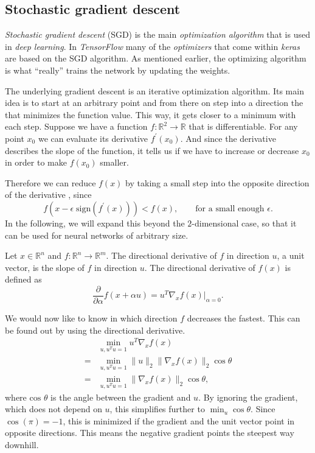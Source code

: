 \subsection{Stochastic gradient descent}
\label{sec:stochastic-gradient-descent}
\emph{Stochastic gradient descent} (SGD) is the main \emph{optimization algorithm} that is used in \emph{deep learning}.
In \emph{TensorFlow} many of the \emph{optimizers} that come within \emph{keras} are based on the SGD algorithm.
As mentioned earlier, the optimizing algorithm is what \enquote{really} trains the network by updating the weights.

The underlying gradient descent is an iterative optimization algorithm.
Its main idea is to start at an arbitrary point and from there on step into a direction the that minimizes the function value.
This way, it gets closer to a minimum with each step.
Suppose we have a function \(f : \mathbb{R}^2 \rightarrow \mathbb{R}\) that is differentiable.
For any point \(x_0\) we can evaluate its derivative \(f^{\prime}(x_0)\).
And since the derivative describes the slope of the function, it tells us if we have to increase or decrease \(x_0\) in order to make \(f(x_0)\) smaller.

Therefore we can reduce \(f(x)\) by taking a small step into the opposite direction of the derivative \cite{cauchy}, since
\begin{equation}
    \label{eq:cauchy}
    f(x - \epsilon \; \text{sign}(f^{\prime}(x))) < f(x), \qquad \text{for a small enough } \epsilon.
\end{equation}
In the following, we will expand this beyond the \(2\)-dimensional case, so that it can be used for neural networks of arbitrary size.

Let \(x \in \mathbb{R}^n\) and \(f : \mathbb{R}^n \rightarrow \mathbb{R}^m\).
The directional derivative of \(f\) in direction \(u\), a unit vector, is the slope of \(f\) in direction \(u\).
The directional derivative of \(f(x)\) is defined as 
\begin{equation}
    \frac{\partial}{\partial \alpha} f(x + \alpha u) = u^{T} \nabla_x f(x) \big\vert_{\alpha = 0}.
\end{equation}

We would now like to know in which direction \(f\) decreases the fastest.
This can be found out by using the directional derivative.
\begin{align}
      &\min_{u, u^{T}u = 1} u^{T} \nabla_x f(x) \\
    = &\min_{u, u^{T}u = 1} \lVert u \rVert_2 \lVert \nabla_x f(x) \rVert_2 \cos \theta \\
    = &\min_{u, u^{T}u = 1} \lVert \nabla_x f(x) \rVert_2 \cos \theta,
\end{align}
where \(\text{cos } \theta\) is the angle between the gradient and \(u\).
By ignoring the gradient, which does not depend on \(u\), this simplifies further to \(\min_{u} \cos \theta\).
Since \(\cos(\pi) = -1\), this is minimized if the gradient and the unit vector point in opposite directions.
This means the negative gradient points the steepest way downhill.


